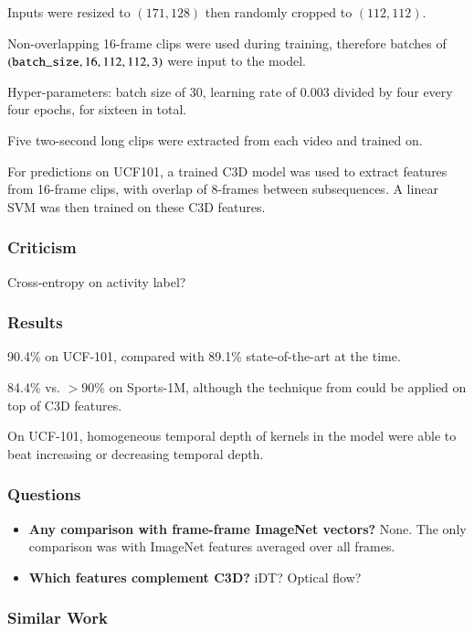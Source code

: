 \documentclass[a4paper, 12pt]{article}
\begin{document}
Inputs were resized to $(171, 128)$ then randomly cropped to $(112, 112)$.

Non-overlapping 16-frame clips were used during training, therefore batches of
$(\verb|batch_size|, 16, 112, 112, 3)$ were input to the model.

Hyper-parameters: batch size of 30, learning rate of 0.003 divided by four
every four epochs, for sixteen in total.

Five two-second long clips were extracted from each video and trained on.

For predictions on UCF101, a trained C3D model was used to extract features
from 16-frame clips, with overlap of 8-frames between subsequences. A linear
SVM was then trained on these C3D features.

\subsubsection{Criticism}

Cross-entropy on activity label?

\subsubsection{Results}

90.4\% on UCF-101, compared with 89.1\% state-of-the-art at the time.

84.4\% vs. $> 90\%$ on Sports-1M, although the technique
from\cite{DBLP:journals/corr/NgHVVMT15} could be applied on top of C3D
features.

On UCF-101, homogeneous temporal depth of kernels in the model were able to
beat increasing or decreasing temporal depth.

\subsubsection{Questions}

\begin{itemize}
\item \textbf{Any comparison with frame-frame ImageNet vectors?} None. The only
        comparison was with ImageNet features averaged over all frames.

\item \textbf{Which features complement C3D?} iDT\@? Optical flow?
\end{itemize}

\subsubsection{Similar Work}
\end{document}
